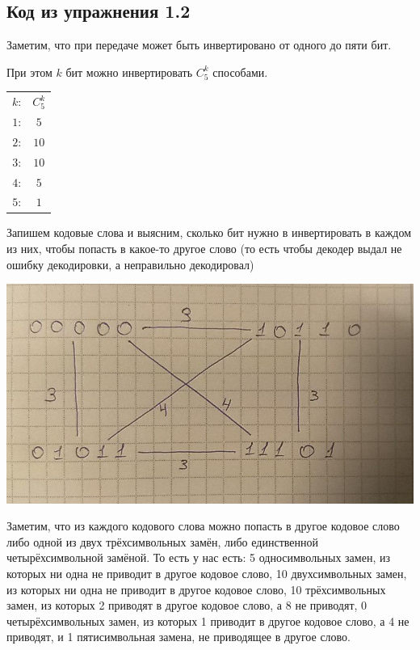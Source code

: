 \documentclass{article}
\begin{document}
	\subsection{Код из упражнения 1.2}
	
	Заметим, что при передаче может быть инвертировано от одного до пяти бит.
	
	При этом $k$ бит можно инвертировать $C^k_5$ способами.
	
	\begin{center}
		\begin{tabular}{cc}
			$k$: & $C^k_5$ \\
			$1$: & $5$\\
			$2$: & $10$ \\
			$3$: & $10$ \\
			$4$: & $5$ \\
			$5$: & $1$  \\
		\end{tabular}
	\end{center}
	
	Запишем кодовые слова и выясним, сколько  бит нужно в инвертировать в каждом из них, чтобы попасть в какое-то другое слово (то есть чтобы декодер выдал не ошибку декодировки, а неправильно декодировал)
	
	\includegraphics[scale=0.5]{pic/pic-1.jpg}
	
	Заметим, что из каждого кодового слова можно попасть в другое кодовое слово либо одной из двух трёхсимвольных замён, либо единственной четырёхсимвольной замёной. То есть у нас есть: 5 односимвольных замен, из которых ни одна не приводит в другое кодовое слово, 10 двухсимвольных замен, из которых ни одна не приводит в другое кодовое слово, 10 трёхсимвольных замен, из которых 2 приводят в другое кодовое слово, а 8 не приводят, 0 четырёхсимвольных замен, из которых 1 приводит в другое кодовое слово, а 4 не приводят, и 1 пятисимвольная замена, не приводящее в другое слово.
	
\end{document}
